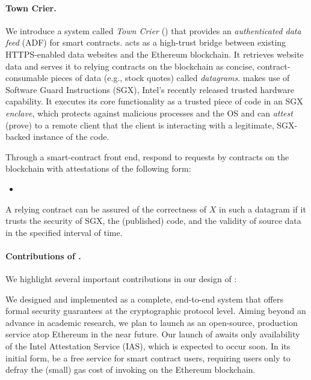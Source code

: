 \vspace{-2mm}
\paragraph{\bf Town Crier.} We introduce a system called \emph{Town Crier} (\tc) that provides an \emph{authenticated data feed} (ADF) for smart contracts. \tc acts as a high-trust bridge between existing HTTPS-enabled data websites and the Ethereum blockchain. It retrieves website data and serves it to relying contracts on the blockchain as concise, contract-consumable pieces of data (e.g., stock quotes) called \emph{datagrams}. \tc makes use of Software Guard Instructions (SGX),  Intel's recently released trusted hardware capability. It executes its core functionality as a trusted piece of code in an SGX \emph{enclave}, which protects against malicious processes and the OS and can \emph{attest} (prove) to a remote client that the client is interacting with a legitimate, SGX-backed instance of the \tc code. 

Through a smart-contract front end, \tcs respond to requests by contracts on the blockchain with attestations of the following form:

\begin{itemize}[leftmargin=3mm]
\item[]
\end{itemize}

A relying contract can be assured of the correctness of $X$ in such a datagram if it trusts the security of SGX, the (published) \tc code, and the validity of source data in the specified interval of time.

\vspace{-2mm}
\paragraph{Contributions of \tc.}

We highlight several important contributions in our design of \tc:

\vspace{2mm}
We designed and implemented \tcs as a complete, end-to-end system that offers formal security guarantees
at the cryptographic protocol level. Aiming beyond an advance in academic research, we plan to launch \tcs
as an open-source, production service atop Ethereum in the near future. Our launch of \tc awaits only availability of the Intel Attestation Service (IAS), which is expected to occur soon. In its initial form, \tcs be a free service for smart contract users, requiring users only to defray the (small) gas cost of invoking \tc on the Ethereum blockchain. 

